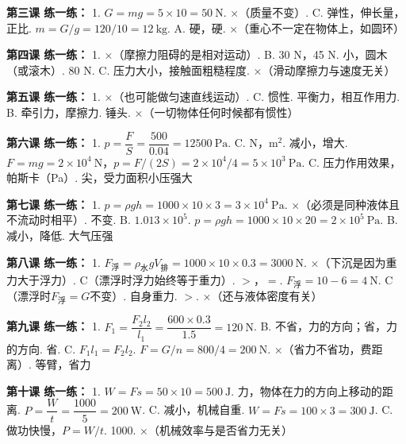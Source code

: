 \documentclass[a4paper,12pt]{ctexart}
\begin{document}
\textbf{第三课 练一练：}
1. $G = mg = 5\times10 = 50\ \text{N}$. ×（质量不变）. C. 弹性，伸长量，正比. $m = G/g = 120/10 = 12\ \text{kg}$. A. 硬，硬. ×（重心不一定在物体上，如圆环）

\textbf{第四课 练一练：}
1. ×（摩擦力阻碍的是相对运动）. B. 30 N，45 N. 小，圆木（或滚木）. 80 N. C. 压力大小，接触面粗糙程度. ×（滑动摩擦力与速度无关）

\textbf{第五课 练一练：}
1. ×（也可能做匀速直线运动）. C. 惯性. 平衡力，相互作用力. B. 牵引力，摩擦力. 锤头. ×（一切物体任何时候都有惯性）

\textbf{第六课 练一练：}
1. $p = \dfrac{F}{S} = \dfrac{500}{0.04} = 12500\ \text{Pa}$. C. N，m$^2$. 减小，增大. $F=mg=2\times10^4\ \text{N}$，$p=F/(2S)=2\times10^4/4=5\times10^3\ \text{Pa}$. C. 压力作用效果，帕斯卡（Pa）. 尖，受力面积小压强大

\textbf{第七课 练一练：}
1. $p = \rho gh = 1000\times10\times3 = 3\times10^4\ \text{Pa}$. ×（必须是同种液体且不流动时相平）. 不变. B. $1.013\times10^5$. $p=\rho gh=1000\times10\times20=2\times10^5\ \text{Pa}$. B. 减小，降低. 大气压强

\textbf{第八课 练一练：}
1. $F_{\text{浮}} = \rho_{\text{水}}gV_{\text{排}} = 1000\times10\times0.3 = 3000\ \text{N}$. ×（下沉是因为重力大于浮力）. C（漂浮时浮力始终等于重力）. $>$，$=$. $F_{\text{浮}} = 10-6 = 4\ \text{N}$. C（漂浮时$F_{\text{浮}}=G$不变）. 自身重力. $>$. ×（还与液体密度有关）

\textbf{第九课 练一练：}
1. $F_1 = \dfrac{F_2l_2}{l_1} = \dfrac{600\times0.3}{1.5} = 120\ \text{N}$. B. 不省，力的方向；省，力的方向. 省. C. $F_1l_1 = F_2l_2$. $F = G/n = 800/4 = 200\ \text{N}$. ×（省力不省功，费距离）. 等臂，省力

\textbf{第十课 练一练：}
1. $W = Fs = 50\times10 = 500\ \text{J}$. 力，物体在力的方向上移动的距离. $P = \dfrac{W}{t} = \dfrac{1000}{5} = 200\ \text{W}$. C. 减小，机械自重. $W = Fs = 100\times3 = 300\ \text{J}$. C. 做功快慢，$P=W/t$. 1000. ×（机械效率与是否省力无关）
\end{document}
